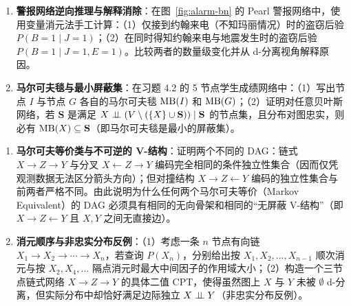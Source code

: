 \begin{enumerate}[label=\textbf{4.\arabic*}, resume]
  \item \textbf{警报网络逆向推理与解释消除}：在图~\ref{fig:alarm-bn} 的 Pearl 警报网络中，使用变量消元法手工计算：（1）仅接到约翰来电（不知玛丽情况）时的盗窃后验 $P(B=1 \mid J=1)$；（2）在同时得知约翰来电与地震发生时的盗窃后验 $P(B=1 \mid J=1, E=1)$。比较两者的数量级变化并从 d-分离视角解释原因。

  \item \textbf{马尔可夫毯与最小屏蔽集}：在习题 4.2 的 5 节点学生成绩网络中：（1）写出节点 $I$ 与节点 $G$ 各自的马尔可夫毯 $\operatorname{MB}(I)$ 和 $\operatorname{MB}(G)$；（2）证明对任意贝叶斯网络，若 $\mathbf{S}$ 是满足 $X \perp\!\!\!\perp (V \setminus (\{X\}\cup \mathbf{S})) \mid \mathbf{S}$ 的节点集，且分布对图忠实，则必有 $\operatorname{MB}(X) \subseteq \mathbf{S}$（即马尔可夫毯是最小的屏蔽集）。
\end{enumerate}


\begin{enumerate}[label=\textbf{4.\arabic*}, resume]
  \item \textbf{马尔可夫等价类与不可逆的 V-结构}：证明两个不同的 DAG：链式 $X \to Z \to Y$ 与分叉 $X \leftarrow Z \to Y$ 编码完全相同的条件独立性集合（因而仅凭观测数据无法区分箭头方向）；但对撞结构 $X \to Z \leftarrow Y$ 编码的独立性集合与前两者严格不同。由此说明为什么任何两个马尔可夫等价（Markov Equivalent）的 DAG 必须具有相同的无向骨架和相同的“无屏蔽 V-结构”（即 $X \to Z \leftarrow Y$ 且 $X, Y$ 之间无直接边）。

  \item \textbf{消元顺序与非忠实分布反例}：（1）考虑一条 $n$ 节点有向链 $X_1 \to X_2 \to \cdots \to X_n$，若查询 $P(X_n)$，分别给出按 $X_1, X_2, \dots, X_{n-1}$ 顺次消元与按 $X_2, X_4, \dots$ 隔点消元时最大中间因子的作用域大小；（2）构造一个三节点链式网络 $X \to Z \to Y$ 的具体二值 CPT，使得虽然图上 $X$ 与 $Y$ 未被 $\emptyset$ d-分离，但实际分布中却恰好满足边际独立 $X \perp\!\!\!\perp Y$（非忠实分布反例）。
\end{enumerate}

